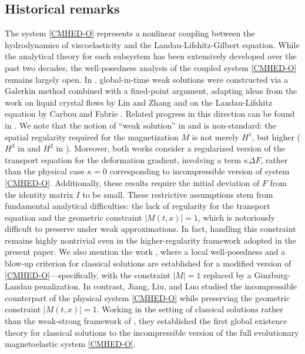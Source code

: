 \documentclass[reqno,11pt]{amsart}
\numberwithin{equation}{section}
\begin{document}
\subsection{Historical remarks}

The system \eqref{CMHED-O} represents a nonlinear coupling between the hydrodynamics of viscoelasticity and the Landau-Lifshitz-Gilbert equation. While the analytical theory for each subsystem has been extensively developed over the past two decades, the well-posedness analysis of the coupled system \eqref{CMHED-O} remains largely open. In \cite{BFLS-2018-SIAM}, global-in-time weak solutions were constructed via a Galerkin method combined with a fixed-point argument, adapting ideas from the work on liquid crystal flows by Lin and Zhang \cite{ref19} and on the Landau-Lifshitz equation by Carbou and Fabrie \cite{ref5}. Related progress in this direction can be found in \cite{ref16,ref33}. We note that the notion of ``weak solution'' in \cite{BFLS-2018-SIAM} and \cite{ref16} is non-standard: the spatial regularity required for the magnetization $M$ is not merely $H^1$, but higher ($H^3$ in \cite{BFLS-2018-SIAM} and $H^2$ in \cite{ref16}). Moreover, both works consider a regularized version of the transport equation for the deformation gradient, involving a term $\kappa \Delta F$, rather than the physical case $\kappa = 0$ corresponding to incompressible version of system \eqref{CMHED-O}. Additionally, these results require the initial deviation of $F$ from the identity matrix $I$ to be small. These restrictive assumptions stem from fundamental analytical difficulties: the lack of regularity for the transport equation and the geometric constraint $|M(t,x)| = 1$, which is notoriously difficult to preserve under weak approximations. In fact, handling this constraint remains highly nontrivial even in the higher-regularity framework adopted in the present paper. We also mention the work \cite{ref33}, where a local well-posedness and a blow-up criterion for classical solutions are established for a modified version of \eqref{CMHED-O}---specifically, with the constraint $|M|=1$ replaced by a Ginzburg-Landau penalization. In contrast, Jiang, Liu, and Luo \cite{JLL-JDE-2023} studied the incompressible counterpart of the physical system \eqref{CMHED-O} while preserving the geometric constraint $|M(t,x)| = 1$. Working in the setting of classical solutions rather than the weak-strong framework of \cite{BFLS-2018-SIAM,ref16}, they established the first global existence theory for classical solutions to the incompressible version of the full evolutionary magnetoelastic system \eqref{CMHED-O}.
\end{document}
